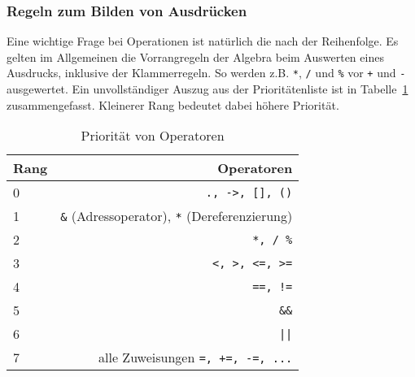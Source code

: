 \subsubsection{Regeln zum Bilden von Ausdrücken}

Eine wichtige Frage bei Operationen ist natürlich die nach der Reihenfolge.
Es gelten im Allgemeinen die Vorrangregeln der Algebra beim Auswerten eines Ausdrucks, inklusive der Klammerregeln.
So werden z.B. \verb|*|, \verb|/| und \verb|%| vor \verb|+| und \verb|-| ausgewertet.
Ein unvollständiger Auszug aus der Prioritätenliste ist in Tabelle~\ref{tab:prior} zusammengefasst.
Kleinerer Rang bedeutet dabei höhere Priorität.

\begin{table}
  \centering
  \begin{tabular}{l r}
    \hline
    Rang & Operatoren \\
    \hline
    0 & \texttt{., ->, [], ()}\\
    1 & \texttt{\&} (Adressoperator), \texttt{*} (Dereferenzierung)\\
    2 & \texttt{*, / \%}\\
    3 & \texttt{<, >, <=, >=}\\
    4 & \texttt{==, !=}\\
    5 & \texttt{\&\&}\\
    6 & \texttt{||}\\
    7 & alle Zuweisungen \texttt{=, +=, -=, ...}\\
    \hline
  \end{tabular}
  \caption{Priorität von Operatoren}
  \label{tab:prior}
\end{table}
